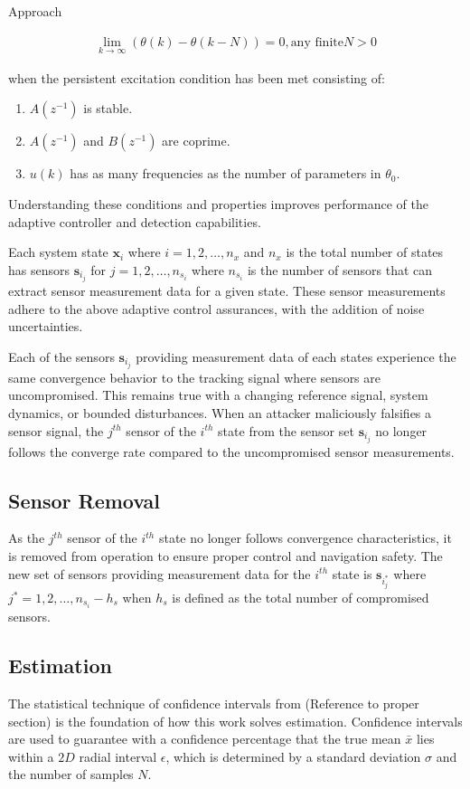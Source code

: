 \begin{section}{Approach}
\begin{enumerate}[label=(\roman*)]
\begin{align}
	        \lim_{k\to\infty}(\theta(k)-\theta(k-N))=0, \text{any finite} N>0 \nonumber
	    \end{align}
	\end{enumerate}
when the persistent excitation condition has been met consisting of:
    \begin{enumerate}[label=(\alph*)]
	\item $A(z^{-1})$ is stable.
	\item $A(z^{-1})$ and $B(z^{-1})$ are coprime.
	\item $u(k)$ has as many frequencies as the number of parameters in $\theta_0$.
	\end{enumerate}
Understanding these conditions and properties improves performance of the adaptive controller and detection capabilities.

Each system state $\bm{x}_i$ where $i=1,2,\dots,n_x$ and $n_x$ is the total number of states has sensors $\bm{s}_i_j$ for $j=1,2,\dots,n_{s_i}$ where $n_{s_i}$ is the number of sensors that can extract sensor measurement data for a given state. These sensor measurements adhere to the above adaptive control assurances, with the addition of noise uncertainties.

Each of the sensors $\bm{s}_i_j$ providing measurement data of each states experience the same convergence behavior to the tracking signal where sensors are uncompromised. This remains true with a changing reference signal, system dynamics, or bounded disturbances. When an attacker maliciously falsifies a sensor signal, the $j^{th}$ sensor of the $i^{th}$ state from the sensor set $\bm{s}_i_j$ no longer follows the converge rate compared to the uncompromised sensor measurements. 

\subsection{Sensor Removal}

As the $j^{th}$ sensor of the $i^{th}$ state no longer follows convergence characteristics, it is removed from operation to ensure proper control and navigation safety. The new set of sensors providing measurement data for the $i^{th}$ state is $\bm{s}_i_j^*$ where $j^*=1,2,\dots,n_{s_i}-h_s$ when $h_s$ is defined as the total number of compromised sensors.

\subsection{Estimation}
The statistical technique of confidence intervals from (Reference to proper section) is the foundation of how this work solves estimation. Confidence intervals are used to guarantee with a confidence percentage that the true mean $\bar{x}$ lies within a $2D$ radial interval $\epsilon$, which is determined by a standard deviation $\sigma$ and the number of samples $N$. 


\end{section}
